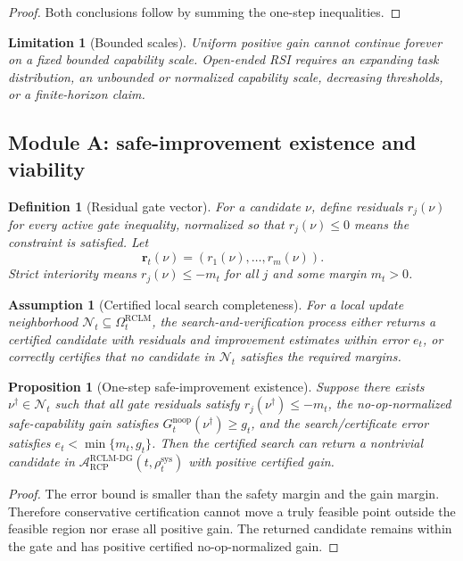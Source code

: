 \documentclass[11pt,a4paper]{article}
\newtheorem{proposition}[theorem]{Proposition}
\newtheorem{definition}[theorem]{Definition}
\newtheorem{assumption}[theorem]{Assumption}
\newtheorem{limitation}[theorem]{Limitation}
\newcommand{\Acal}{\mathcal A}
\newcommand{\RCP}{\mathrm{RCP}}
\newcommand{\RCLM}{\mathrm{RCLM}}
\newcommand{\DG}{\mathrm{DG}}
\newcommand{\sys}{\mathrm{sys}}
\begin{document}
\begin{proof}
Both conclusions follow by summing the one-step inequalities.
\end{proof}

\begin{limitation}[Bounded scales]
Uniform positive gain cannot continue forever on a fixed bounded capability scale. Open-ended RSI requires an expanding task distribution, an unbounded or normalized capability scale, decreasing thresholds, or a finite-horizon claim.
\end{limitation}

\subsection{Module A: safe-improvement existence and viability}

\begin{definition}[Residual gate vector]
For a candidate \(\nu\), define residuals \(r_j(\nu)\) for every active gate inequality, normalized so that \(r_j(\nu)\le0\) means the constraint is satisfied. Let
\[
\mathbf r_t(\nu)=(r_1(\nu),\ldots,r_m(\nu)).
\]
Strict interiority means \(r_j(\nu)\le-m_t\) for all \(j\) and some margin \(m_t>0\).
\end{definition}

\begin{assumption}[Certified local search completeness]
For a local update neighborhood \(\mathcal N_t\subseteq\Omega_t^{\RCLM}\), the search-and-verification process either returns a certified candidate with residuals and improvement estimates within error \(e_t\), or correctly certifies that no candidate in \(\mathcal N_t\) satisfies the required margins.
\end{assumption}

\begin{proposition}[One-step safe-improvement existence]
Suppose there exists \(\nu^\dagger\in\mathcal N_t\) such that all gate residuals satisfy \(r_j(\nu^\dagger)\le-m_t\), the no-op-normalized safe-capability gain satisfies \(G_t^{\mathrm{noop}}(\nu^\dagger)\ge g_t\), and the search/certificate error satisfies \(e_t<\min\{m_t,g_t\}\). Then the certified search can return a nontrivial candidate in \(\Acal_{\RCP}^{\RCLM\text{-}\DG}(t,\rho_t^{\sys})\) with positive certified gain.
\end{proposition}

\begin{proof}
The error bound is smaller than the safety margin and the gain margin. Therefore conservative certification cannot move a truly feasible point outside the feasible region nor erase all positive gain. The returned candidate remains within the gate and has positive certified no-op-normalized gain.
\end{proof}
\end{document}
